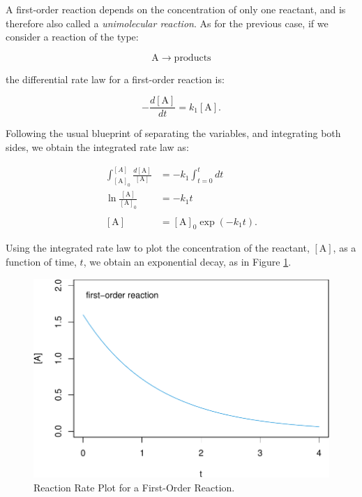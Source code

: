 \documentclass[
  9pt,
]{extbook}
\theoremstyle{definition}
\theoremstyle{definition}
\theoremstyle{definition}
\theoremstyle{remark}
\begin{document}
A first-order reaction depends on the concentration of only one reactant, and is therefore also called a \emph{unimolecular reaction}. As for the previous case, if we consider a reaction of the type:

\begin{equation}
\mathrm{A}\rightarrow \text{products}
\end{equation}

the differential rate law for a first-order reaction is:

\begin{equation}
- \frac{d[\mathrm{A}]}{dt}=k_1 [\mathrm{A}].
\label{eq:kin6}
\end{equation}

Following the usual blueprint of separating the variables, and integrating both sides, we obtain the integrated rate law as:

\begin{equation}
\begin{aligned}
\int_{[\mathrm{A}]_0}^{[A]} \frac{d[\mathrm{A}]}{[\mathrm{A}]} &= -k_1 \int_{t=0}^{t} dt \\
\ln \frac{[\mathrm{A}]}{[\mathrm{A}]_0}&=-k_1 t\\ \\
[\mathrm{A}] &= [\mathrm{A}]_0 \exp(-k_1 t).
\end{aligned}
\label{eq:kin7}
\end{equation}

Using the integrated rate law to plot the concentration of the reactant, \([\mathrm{A}]\), as a function of time, \(t\), we obtain an exponential decay, as in Figure \ref{fig:figk2}.

\begin{figure}

{\centering \includegraphics{pchem1_files/figure-latex/figk2-1} 

}

\caption{Reaction Rate Plot for a First-Order Reaction.}\label{fig:figk2}
\end{figure}
\end{document}

